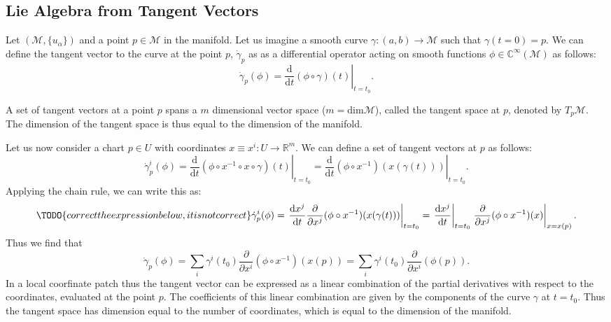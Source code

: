 \subsection{Lie Algebra from Tangent Vectors}

\begin{definition}
    Let \((\mathcal{M}, \{u_{\alpha}\})\) and a point \(p \in \mathcal{M}\) in the manifold. Let us imagine a smooth curve \(\gamma : (a, b) \to \mathcal{M}\) such that \(\gamma(t=0) = p\). We can define the tangent vector to the curve at the point \(p\), \(\dot{\gamma}_p\) as as a differential operator acting on smooth functions \(\phi \in \mathbb{C}^{\infty}(\mathcal{M})\) as follows:
    \[
        \dot{\gamma}_p(\phi) = \left. \frac{\mathrm{d}}{\mathrm{d} t} (\phi \circ \gamma) (t)\right|_{t=t_0}.
    \]
\end{definition}

A set of tangent vectors at a point \(p\) spans a \(m\) dimensional vector space (\(m = \mathrm{dim} \mathcal{M}\)), called the tangent space at \(p\), denoted by \(T_p \mathcal{M}\). The dimension of the tangent space is thus equal to the dimension of the manifold.

Let us now consider a chart \(p \in U\) with coordinates \(x \equiv x^i : U \to \mathbb{R}^m\). We can define a set of tangent vectors at \(p\) as follows:
\[
    \dot{\gamma}_p^i(\phi) = \left. \frac{\mathrm{d}}{\mathrm{d} t} (\phi \circ x^{-1} \circ x \circ \gamma) (t)\right|_{t=t_0} = \left. \frac{\mathrm{d}}{\mathrm{d} t} (\phi \circ x^{-1}) (x(\gamma(t)))\right|_{t=t_0}.
\]
Applying the chain rule, we can write this as:
\[\TODO{correct the expression below, it is not correct}
    \dot{\gamma}_p^i(\phi) = \left. \frac{\mathrm{d} x^j}{\mathrm{d} t} \frac{\partial}{\partial x^j} (\phi \circ x^{-1}) (x(\gamma(t)))\right|_{t=t_0} = \left. \frac{\mathrm{d} x^j}{\mathrm{d} t}\right|_{t=t_0} \left. \frac{\partial}{\partial x^j} (\phi \circ x^{-1}) (x)\right|_{x=x(p)}.
\]
Thus we find that
\[
    \dot{\gamma}_p(\phi) = \sum_{i} \gamma^i(t_0) \frac{\partial}{\partial x^i} (\phi \circ x^{-1}) (x(p)) = \sum_{i} \gamma^i(t_0) \frac{\partial}{\partial x^i} (\phi(p)).
\]
In a local coorfinate patch thus the tangent vector can be expressed as a linear combination of the partial derivatives with respect to the coordinates, evaluated at the point \(p\). The coefficients of this linear combination are given by the components of the curve \(\gamma\) at \(t=t_0\). Thus the tangent space has dimension equal to the number of coordinates, which is equal to the dimension of the manifold.

